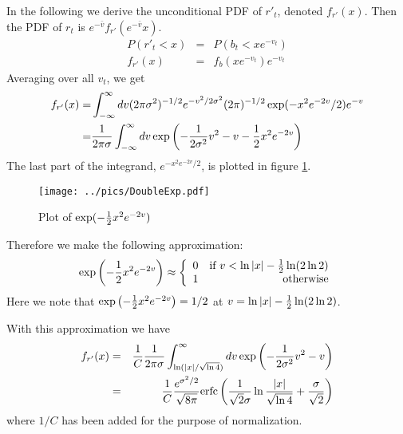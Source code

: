 \documentclass{book}
\begin{document}
In the following we derive the unconditional PDF of $r'_t$, denoted
$f_{r'}(x)$. Then the PDF of $r_t$ is $e^{-\bar{v}}f_{r'}(e^{-\bar{v}}x)$.
\begin{eqnarray*}
  P(r'_t < x) &=& P(b_t < xe^{-v_t}) \\
  f_{r'}(x) &=& f_b(xe^{-v_t}) e^{-v_t}
\end{eqnarray*}
Averaging over all $v_t$, we get
\begin{equation}\label{eq:UncondPDFSymmetric}
  \begin{aligned}
    f_{r'}(x) =& \int_{-\infty}^{\infty} dv (2\pi\sigma^2)^{-1/2}
    e^{-v^2/2\sigma^2}(2\pi)^{-1/2} \exp(-x^2e^{-2v}/2) e^{-v} \\
    =& {1 \over 2\pi\sigma} \int_{-\infty}^{\infty} dv
    \exp\left(
      -{1 \over 2\sigma^2} v^2 - v -{1 \over 2} x^2 e^{-2v}
    \right)
  \end{aligned}
  \end{equation}
The last part of the integrand, $e^{-x^2 e^{-2v} / 2}$, is plotted in
figure \ref{fig:DoubleExp}.
\begin{figure}[htb!]
  \centering
  \texttt{[image: ../pics/DoubleExp.pdf]}
  \caption{\footnotesize Plot of $\exp(-{1 \over 2} x^2 e^{-2v})$}
  \label{fig:DoubleExp}
\end{figure}
Therefore we make the following approximation:
\[
\exp\left(-{1 \over 2} x^2 e^{-2v}\right) \approx \left\{
  \begin{array}{lr}
    0 & \text{if } v < \ln|x| -{1 \over 2} \ln(2\ln 2) \\
    1 & \text{otherwise}
  \end{array}
\right.
\]
Here we note that $\exp\left(-{1 \over 2} x^2 e^{-2v}\right) = 1/2$ at
$v = \ln|x| -{1 \over 2} \ln(2\ln 2)$.

With this approximation we have
\begin{eqnarray*}
  f_{r'}(x) &=& {1\over C}{1 \over 2\pi\sigma} \int_{\ln(|x|/\sqrt{\ln
      4})}^{\infty} dv
  \exp\left(-{1 \over 2\sigma^2} v^2 - v\right) \\
  &=& {1\over C}{e^{\sigma^2 / 2} \over \sqrt{8\pi}} \text{erfc} \left(
    {1 \over \sqrt{2}\sigma} \ln{|x| \over \sqrt{\ln 4}} + {\sigma
      \over \sqrt{2}}
  \right)
\end{eqnarray*}
where $1/C$ has been added for the purpose of normalization.
\end{document}
